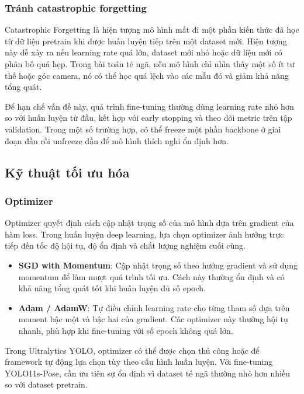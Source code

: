 \documentclass[12pt, a4paper]{article}
\begin{document}
\subsubsection{Tránh catastrophic forgetting}
Catastrophic Forgetting là hiện tượng mô hình mất đi một phần kiến thức đã học từ dữ liệu pretrain khi được huấn luyện tiếp trên một dataset mới.
Hiện tượng này dễ xảy ra nếu learning rate quá lớn, dataset mới nhỏ hoặc dữ liệu mới có phân bố quá hẹp.
Trong bài toán té ngã, nếu mô hình chỉ nhìn thấy một số ít tư thế hoặc góc camera, nó có thể học quá lệch vào các mẫu đó và giảm khả năng tổng quát.

Để hạn chế vấn đề này, quá trình fine-tuning thường dùng learning rate nhỏ hơn so với huấn luyện từ đầu, kết hợp với early stopping và theo dõi metric trên tập validation.
Trong một số trường hợp, có thể freeze một phần backbone ở giai đoạn đầu rồi unfreeze dần để mô hình thích nghi ổn định hơn.

\subsection{Kỹ thuật tối ưu hóa}

\subsubsection{Optimizer}
Optimizer quyết định cách cập nhật trọng số của mô hình dựa trên gradient của hàm loss.
Trong huấn luyện deep learning, lựa chọn optimizer ảnh hưởng trực tiếp đến tốc độ hội tụ, độ ổn định và chất lượng nghiệm cuối cùng.

\begin{itemize}
  \item \textbf{SGD with Momentum}: Cập nhật trọng số theo hướng gradient và sử dụng momentum để làm mượt quá trình tối ưu. Cách này thường ổn định và có khả năng tổng quát tốt khi huấn luyện đủ số epoch.
  \item \textbf{Adam / AdamW}: Tự điều chỉnh learning rate cho từng tham số dựa trên moment bậc một và bậc hai của gradient. Các optimizer này thường hội tụ nhanh, phù hợp khi fine-tuning với số epoch không quá lớn.
\end{itemize}

Trong Ultralytics YOLO, optimizer có thể được chọn thủ công hoặc để framework tự động lựa chọn tùy theo cấu hình huấn luyện.
Với fine-tuning YOLO11s-Pose, cần ưu tiên sự ổn định vì dataset té ngã thường nhỏ hơn nhiều so với dataset pretrain.
\end{document}

